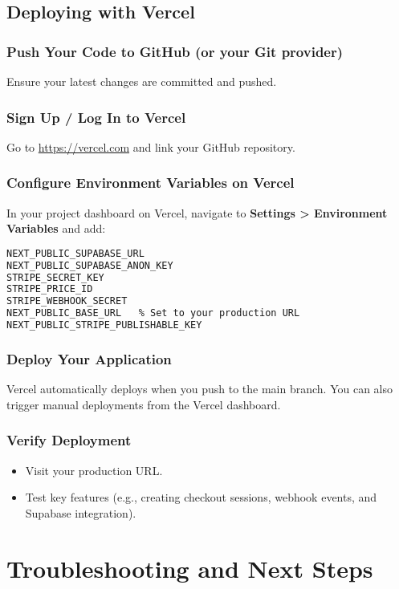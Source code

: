 \documentclass[11pt]{article}
\begin{document}
\subsection{Deploying with Vercel}

\subsubsection{Push Your Code to GitHub (or your Git provider)}
Ensure your latest changes are committed and pushed.

\subsubsection{Sign Up / Log In to Vercel}
Go to \url{https://vercel.com} and link your GitHub repository.

\subsubsection{Configure Environment Variables on Vercel}
In your project dashboard on Vercel, navigate to \textbf{Settings > Environment Variables} and add:
\begin{lstlisting}[language=bash]
NEXT_PUBLIC_SUPABASE_URL
NEXT_PUBLIC_SUPABASE_ANON_KEY
STRIPE_SECRET_KEY
STRIPE_PRICE_ID
STRIPE_WEBHOOK_SECRET
NEXT_PUBLIC_BASE_URL   % Set to your production URL
NEXT_PUBLIC_STRIPE_PUBLISHABLE_KEY
\end{lstlisting}

\subsubsection{Deploy Your Application}
Vercel automatically deploys when you push to the main branch. You can also trigger manual deployments from the Vercel dashboard.

\subsubsection{Verify Deployment}
\begin{itemize}[leftmargin=*]
    \item Visit your production URL.
    \item Test key features (e.g., creating checkout sessions, webhook events, and Supabase integration).
\end{itemize}

\section{Troubleshooting and Next Steps}
\end{document}
